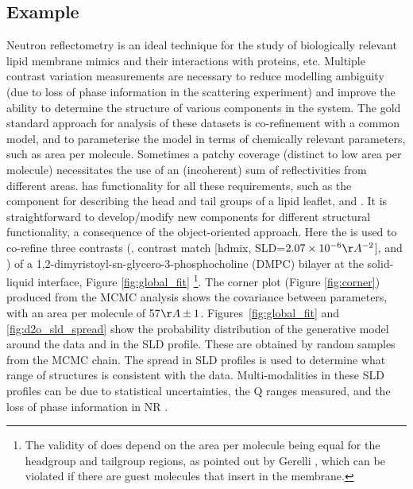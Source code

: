 \documentclass[12pt]{article}
\begin{document}
\subsection*{Example}
Neutron reflectometry is an ideal technique for the study of biologically relevant lipid membrane mimics and their interactions with proteins, etc. Multiple contrast variation measurements are necessary to reduce modelling ambiguity (due to loss of phase information in the scattering experiment) and improve the ability to determine the structure of various components in the system. The gold standard approach for analysis of these datasets is co-refinement with a common model, and to parameterise the model in terms of chemically relevant parameters, such as area per molecule. Sometimes a patchy coverage (distinct to low area per molecule) necessitates the use of an (incoherent) sum of reflectivities from different areas.  has functionality for all these requirements, such as the \LipidLeaflet component for describing the head and tail groups of a lipid leaflet, and \MixedReflectModel. It is straightforward to develop/modify new components for different structural functionality, a consequence of the object-oriented approach. Here the \LipidLeaflet is used to co-refine three contrasts (,  contrast match [hdmix, SLD=$2.07\times10^{-6}\AA^{-2}$], and ) of a 1,2-dimyristoyl-sn-glycero-3-phosphocholine (DMPC) bilayer at the solid-liquid interface, Figure \ref{fig:global_fit} \footnote{The validity of \LipidLeaflet does depend on the area per molecule being equal for the headgroup and tailgroup regions, as pointed out by Gerelli \cite{Gerelli2016}, which can be violated if there are guest molecules that insert in the membrane.}. The corner plot (Figure \ref{fig:corner}) produced from the MCMC analysis shows the covariance between parameters, with an area per molecule of 57$\AA\pm1$. Figures~\ref{fig:global_fit} and \ref{fig:d2o_sld_spread} show the probability distribution of the generative model around the data and in the SLD profile. These are obtained by random samples from the MCMC chain. The spread in SLD profiles is used to determine what range of structures is consistent with the data. Multi-modalities in these SLD profiles can be due to statistical uncertainties, the Q ranges measured, and the loss of phase information in NR \cite{Majkrzak1999, Heinrich2009}.
\end{document}
